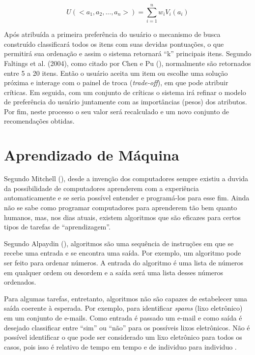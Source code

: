 \begin{equation}
    \label{funcaoUtilidade}
    U(<a_1,a_2,...,a_n>)=\sum_{i=1}^{n} w_i V_i(a_i)
\end{equation}

Após atribuída a primeira preferência do usuário o mecanismo de busca construído classificará todos os itens com suas devidas pontuações, o que permitirá sua ordenação e assim o sistema retornará “k” principais itens. Segundo Faltings et al. (2004), como citado por Chen e Pu (\citeyear{Chen:2012}), normalmente são retornados entre 5 a 20 itens. Então o usuário aceita um item ou escolhe uma solução próxima e interage com o painel de troca (\textit{trade-off}), em que pode atribuir críticas. Em seguida, com um conjunto de críticas o sistema irá refinar o modelo de preferência do usuário juntamente com as importâncias (pesos) dos atributos. Por fim, neste processo o seu valor será recalculado e um novo conjunto de recomendações obtidas.

\section{Aprendizado de Máquina}
\label{machineLearning}

Segundo Mitchell (\citeyear{Mitchell:1997:ML:541177}), desde a invenção dos computadores sempre existiu a duvida da possibilidade de computadores aprenderem com a experiência automaticamente e se seria possível entender e programá-los para esse fim. Ainda não se sabe como programar computadores para aprenderem tão bem quanto humanos, mas, nos dias atuais, existem algoritmos que são eficazes para certos tipos de tarefas de “aprendizagem''. 

Segundo Alpaydin (\citeyear{Alpaydin:2010:IML:1734076}), algoritmos são uma sequência de instruções em que se recebe uma entrada e se encontra uma saída. Por exemplo, um algoritmo pode ser feito para ordenar números. A entrada do algoritmo é uma lista de números em qualquer ordem ou desordem e a saída será uma lista desses números ordenados.

Para algumas tarefas, entretanto, algoritmos não são capazes de estabelecer uma saída coerente à esperada. Por exemplo, para identificar \textit{spams} (lixo eletrônico) em um conjunto de e-mails. Como entrada é passado um e-mail e como saída é desejado classificar entre “sim” ou “não” para os possíveis lixos eletrônicos. Não é possível identificar o que pode ser considerado um lixo eletrônico para todos os casos, pois isso é relativo de tempo em tempo e de individuo para individuo \cite{Alpaydin:2010:IML:1734076}.

